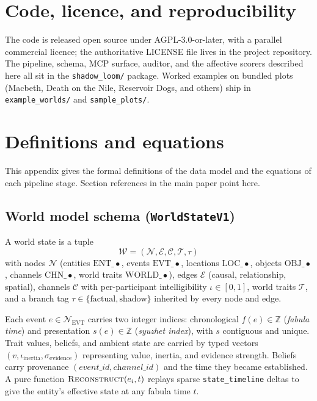 \documentclass[11pt]{article}
\begin{document}
\section*{Code, licence, and reproducibility}

The code is released open source under AGPL-3.0-or-later, with a
parallel commercial licence; the authoritative LICENSE file lives
in the project repository. The pipeline, schema, MCP surface,
auditor, and the affective scorers described here all sit in the
\texttt{shadow\_loom/} package. Worked examples on bundled plots
(Macbeth, Death on the Nile, Reservoir Dogs, and others) ship in
\texttt{example\_worlds/} and \texttt{sample\_plots/}.





\appendix
\onecolumn

\section{Definitions and equations}
\label{app:defs}

This appendix gives the formal definitions of the data model and
the equations of each pipeline stage. Section references in the
main paper point here.

\subsection{World model schema (\texttt{WorldStateV1})}
\label{app:schema}

A world state is a tuple
\[
\mathcal{W} = (\mathcal{N}, \mathcal{E}, \mathcal{C}, \mathcal{T}, \tau)
\]
with nodes $\mathcal{N}$ (entities $\mathrm{ENT}\_\bullet$, events
$\mathrm{EVT}\_\bullet$, locations $\mathrm{LOC}\_\bullet$, objects
$\mathrm{OBJ}\_\bullet$, channels $\mathrm{CHN}\_\bullet$, world
traits $\mathrm{WORLD}\_\bullet$), edges $\mathcal{E}$ (causal,
relationship, spatial), channels $\mathcal{C}$ with per-participant
intelligibility $\iota \in [0,1]$, world traits $\mathcal{T}$, and a
branch tag $\tau \in \{\text{factual}, \text{shadow}\}$ inherited
by every node and edge.

Each event $e \in \mathcal{N}_{\mathrm{EVT}}$ carries two integer
indices: chronological $f(e) \in \mathbb{Z}$ (\emph{fabula time})
and presentation $s(e) \in \mathbb{Z}$ (\emph{syuzhet index}), with
$s$ contiguous and unique. Trait values, beliefs, and ambient
state are carried by typed vectors $(v, \iota_{\mathrm{inertia}},
\sigma_{\mathrm{evidence}})$ representing value, inertia, and
evidence strength. Beliefs carry provenance
$(\textit{event\_id}, \textit{channel\_id})$ and the time they
became established. A pure function
$\textsc{Reconstruct}(e_i, t)$ replays sparse
\texttt{state\_timeline} deltas to give the entity's effective
state at any fabula time $t$.
\end{document}

